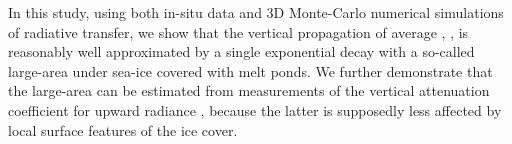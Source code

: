 In this study, using both in-situ data and 3D Monte-Carlo numerical simulations of radiative transfer, we show that the vertical propagation of average \edz{}, \meanedz{}, is reasonably well approximated by a single exponential decay with a so-called large-area \meanked{} under sea-ice covered with melt ponds. We further demonstrate that the large-area \meanked{} can be estimated from measurements of the vertical attenuation coefficient for upward radiance \klu{}, because the latter is supposedly less affected by local surface features of the ice cover. 